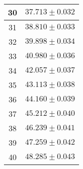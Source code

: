 \documentclass[prb,12pt]{revtex4-2}
\theoremstyle{definition}
\theoremstyle{definition}
\begin{document}
\begin{longtable}{cc}
	30 & $37.713\pm 0.032 $ \\\midrule
	31 & $38.810\pm 0.033 $ \\\midrule
	32 & $39.898\pm 0.034 $ \\\midrule
	33 & $40.980\pm 0.036 $ \\\midrule
	34 & $42.057\pm 0.037 $ \\\midrule
	35 & $43.113\pm 0.038 $ \\\midrule
	36 & $44.160\pm 0.039 $ \\\midrule
	37 & $45.212\pm 0.040 $ \\\midrule
	38 & $46.239\pm 0.041 $ \\\midrule
	39 & $47.259\pm 0.042 $ \\\midrule
	40 & $48.285\pm 0.043 $ \\\bottomrule
\end{longtable}
\end{document}
